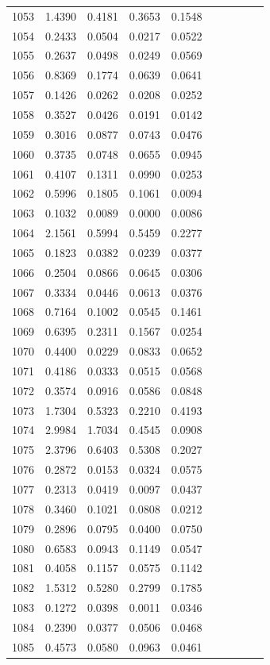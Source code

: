 \begin{table}
\begin{tabular}{cccccccccc}
1053& 1.4390& 0.4181& 0.3653& 0.1548\\ 
1054& 0.2433& 0.0504& 0.0217& 0.0522\\ 
1055& 0.2637& 0.0498& 0.0249& 0.0569\\ 
1056& 0.8369& 0.1774& 0.0639& 0.0641\\ 
1057& 0.1426& 0.0262& 0.0208& 0.0252\\ 
1058& 0.3527& 0.0426& 0.0191& 0.0142\\ 
1059& 0.3016& 0.0877& 0.0743& 0.0476\\ 
1060& 0.3735& 0.0748& 0.0655& 0.0945\\ 
1061& 0.4107& 0.1311& 0.0990& 0.0253\\ 
1062& 0.5996& 0.1805& 0.1061& 0.0094\\ 
1063& 0.1032& 0.0089& 0.0000& 0.0086\\ 
1064& 2.1561& 0.5994& 0.5459& 0.2277\\ 
1065& 0.1823& 0.0382& 0.0239& 0.0377\\ 
1066& 0.2504& 0.0866& 0.0645& 0.0306\\ 
1067& 0.3334& 0.0446& 0.0613& 0.0376\\ 
1068& 0.7164& 0.1002& 0.0545& 0.1461\\ 
1069& 0.6395& 0.2311& 0.1567& 0.0254\\ 
1070& 0.4400& 0.0229& 0.0833& 0.0652\\ 
1071& 0.4186& 0.0333& 0.0515& 0.0568\\ 
1072& 0.3574& 0.0916& 0.0586& 0.0848\\ 
1073& 1.7304& 0.5323& 0.2210& 0.4193\\ 
1074& 2.9984& 1.7034& 0.4545& 0.0908\\ 
1075& 2.3796& 0.6403& 0.5308& 0.2027\\ 
1076& 0.2872& 0.0153& 0.0324& 0.0575\\ 
1077& 0.2313& 0.0419& 0.0097& 0.0437\\ 
1078& 0.3460& 0.1021& 0.0808& 0.0212\\ 
1079& 0.2896& 0.0795& 0.0400& 0.0750\\ 
1080& 0.6583& 0.0943& 0.1149& 0.0547\\ 
1081& 0.4058& 0.1157& 0.0575& 0.1142\\ 
1082& 1.5312& 0.5280& 0.2799& 0.1785\\ 
1083& 0.1272& 0.0398& 0.0011& 0.0346\\ 
1084& 0.2390& 0.0377& 0.0506& 0.0468\\ 
1085& 0.4573& 0.0580& 0.0963& 0.0461\\ 

\end{tabular}
\end{table}
